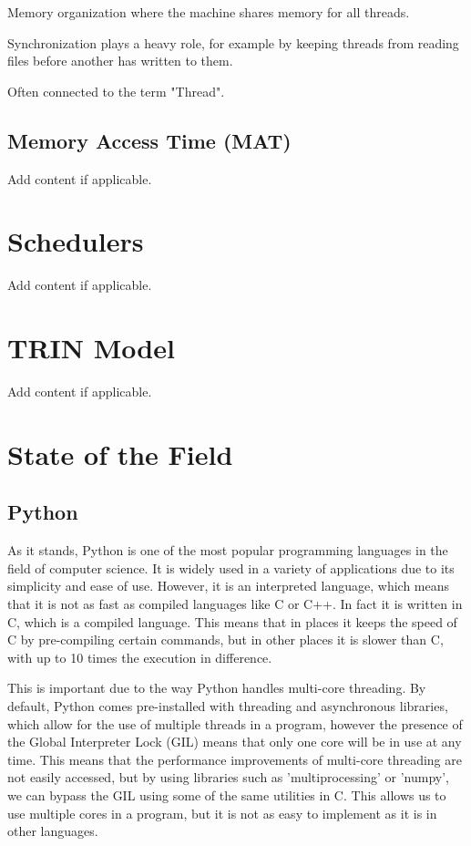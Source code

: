 \documentclass{article}
\begin{document}
Memory organization where the machine shares memory for all threads.

Synchronization plays a heavy role, for example by keeping threads from reading files before another has written to them.

Often connected to the term "Thread".

\subsection{Memory Access Time (MAT)}

Add content if applicable.

\section{Schedulers}

Add content if applicable.

\section{TRIN Model}

Add content if applicable.

\section{State of the Field}
\subsection{Python}

As it stands, Python is one of the most popular programming languages in the field of computer science. It is widely used in a variety of applications due to its simplicity and ease of use. However, it is an interpreted language, which means that it is not as fast as compiled languages like C or C++. In fact it is written in C, which is a compiled language. This means that in places it keeps the speed of C by pre-compiling certain commands, but in other places it is slower than C, with up to 10 times the execution in difference.

This is important due to the way Python handles multi-core threading. By default, Python comes pre-installed with threading and asynchronous libraries, which allow for the use of multiple threads in a program, however the presence of the Global Interpreter Lock (GIL) means that only one core will be in use at any time. This means that the performance improvements of multi-core threading are not easily accessed, but by using libraries such as 'multiprocessing' or 'numpy', we can bypass the GIL using some of the same utilities in C. This allows us to use multiple cores in a program, but it is not as easy to implement as it is in other languages.
\end{document}
